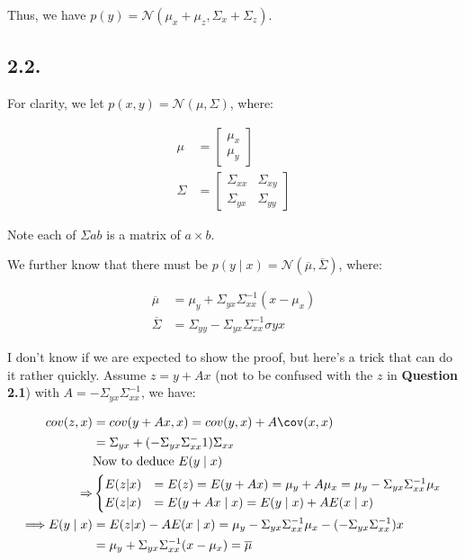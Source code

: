 \documentclass[11pt]{article}
\providecommand{\qbm}[1]{\begin{bmatrix} #1 \end{bmatrix}}
\begin{document}
Thus, we have $p(y) = \mathcal N(\mu_x+\mu_z,\Sigma_x+\Sigma_z)$.


\subsection*{2.2.}


For clarity, we let $p(x, y) = \mathcal N(\mu, \Sigma)$, where:

\begin{align*}
    \mu &= \qbm{\mu_x \\ \mu_y} \\
    \Sigma &= \qbm{\Sigma_{xx} & \Sigma_{xy} \\ \Sigma_{yx} & \Sigma_{yy}}
\end{align*}

Note each of $\Sigma{ab}$ is a matrix of $a \times b$.

We further know that there must be $p(y \mid x) = \mathcal N(\overline{\mu}, \overline{\Sigma})$, where:

\begin{align*}
    \overline{\mu} &= \mu_y + \Sigma_{yx} \Sigma_{xx}^{-1} (x - \mu_x) \\
    \overline{\Sigma} &= \Sigma_{yy} - \Sigma_{yx} \Sigma_{xx}^{-1}\sigma{yx}
\end{align*}

I don't know if we are expected to show the proof, but here's a trick that can do it rather quickly. Assume $z = y + Ax$ (not to be confused with the $z$ in \textbf{Question 2.1}) with $A = -\Sigma_{yx} \Sigma_{xx}^{-1}$, we have:

\begin{align*}
    cov(z, x) &= cov(y + Ax, x) = cov(y, x) + A \cov(x, x) \\
    &= \Sigma_{yx} + (-\Sigma_{yx} \Sigma_{xx}^-1) \Sigma_{xx} \\
    &\text{Now to deduce $E(y \mid x)$} \\
    \Rightarrow &\begin{cases}
        E(z | x) &= E(z) = E(y + Ax) = \mu_y + A \mu_x = \mu_y -\Sigma_{yx} \Sigma_{xx}^{-1} \mu_x \\
        E(z | x) &= E(y + Ax \mid x) = E(y \mid x) + A E(x \mid x)
    \end{cases} \\
    \Longrightarrow E(y \mid x) &= E(z | x) - A E(x \mid x) = \mu_y -\Sigma_{yx} \Sigma_{xx}^{-1} \mu_x - (-\Sigma_{yx} \Sigma_{xx}^{-1}) x \\
    &= \mu_y + \Sigma_{yx} \Sigma_{xx}^{-1} (x - \mu_x) = \overline{\mu}
\end{align*}
\end{document}
